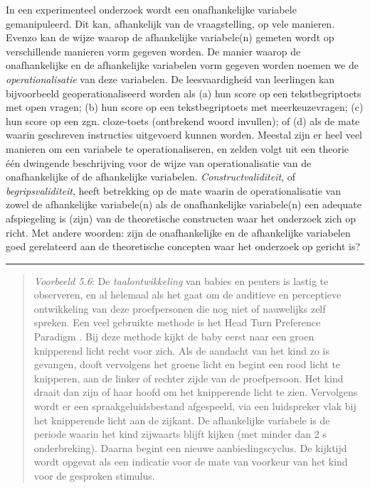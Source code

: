 \documentclass[
]{book}
\begin{document}
In een experimenteel onderzoek wordt een onafhankelijke variabele
gemanipuleerd. Dit kan, afhankelijk van de vraagstelling, op vele
manieren. Evenzo kan de wijze waarop de afhankelijke variabele(n)
gemeten wordt op verschillende manieren vorm gegeven worden. De manier
waarop de onafhankelijke en de afhankelijke variabelen vorm gegeven
worden noemen we de \emph{operationalisatie} van deze variabelen. De
leesvaardigheid van leerlingen kan bijvoorbeeld geoperationaliseerd
worden als (a) hun score op een tekstbegriptoets met open vragen; (b)
hun score op een tekstbegriptoets met meerkeuzevragen; (c) hun score op
een zgn. cloze-toets (ontbrekend woord invullen); of (d) als de mate
waarin geschreven instructies uitgevoerd kunnen worden. Meestal zijn er
heel veel manieren om een variabele te operationaliseren, en zelden
volgt uit een theorie één dwingende beschrijving voor de wijze van
operationalisatie van de onafhankelijke of de afhankelijke variabelen.
\emph{Constructvaliditeit}, of \emph{begripsvaliditeit}, heeft betrekking op de
mate waarin de operationalisatie van zowel de afhankelijke variabele(n)
als de onafhankelijke variabele(n) een adequate afspiegeling is (zijn)
van de theoretische constructen waar het onderzoek zich op richt. Met
andere woorden: zijn de onafhankelijke en de afhankelijke variabelen
goed gerelateerd aan de theoretische concepten waar het onderzoek op
gericht is?

\begin{center}\rule{0.5\linewidth}{0.5pt}\end{center}

\begin{quote}
\emph{Voorbeeld 5.6}: De \emph{taalontwikkeling} van
babies en peuters is lastig te observeren, en al helemaal als het gaat
om de auditieve en perceptieve ontwikkeling van deze proefpersonen die
nog niet of nauwelijks zelf spreken. Een veel gebruikte methode is het
Head Turn Preference Paradigm \citep{John10}. Bij deze methode kijkt de baby
eerst naar een groen knipperend licht recht voor zich. Als de aandacht
van het kind zo is gevangen, dooft vervolgens het groene licht en begint
een rood licht te knipperen, aan de linker of rechter zijde van de
proefpersoon. Het kind draait dan zijn of haar hoofd om het knipperende
licht te zien. Vervolgens wordt er een spraakgeluidsbestand afgespeeld,
via een luidspreker vlak bij het knipperende licht aan de zijkant. De
afhankelijke variabele is de periode waarin het kind zijwaarts blijft
kijken (met minder dan 2 s onderbreking). Daarna begint een nieuwe
aanbiedingscyclus. De kijktijd wordt opgevat als een indicatie voor de
mate van voorkeur van het kind voor de gesproken stimulus.
\end{quote}
\end{document}
